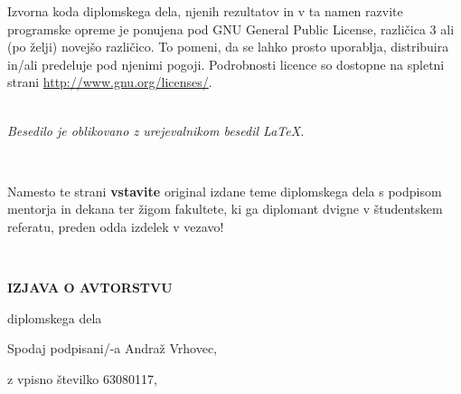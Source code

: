 \documentclass[12pt,a4paper,openany]{book}
\begin{document}
\vspace*{1.5cm}
{\small \noindent
Izvorna koda diplomskega dela, njenih rezultatov in v ta namen razvite programske opreme je ponujena pod GNU General Public License,
različica 3 ali (po želji) novejšo različico. To pomeni, da se lahko prosto uporablja, distribuira in/ali predeluje pod njenimi pogoji.
Podrobnosti licence so dostopne na spletni strani \url{http://www.gnu.org/licenses/}.
}

\begin{center} 
\ \\ \vfill
{\em
Besedilo je oblikovano z urejevalnikom besedil \LaTeX.
}
\end{center}

\newpage

\ \thispagestyle{empty}

\newpage


\thispagestyle{empty}

Namesto te strani {\bf vstavite} original izdane teme diplomskega dela s podpisom mentorja in dekana ter \v zigom fakultete, ki ga diplomant
dvigne v študent\-skem referatu,  preden odda izdelek v vezavo!

\newpage


\ \thispagestyle{empty}

\newpage



\thispagestyle{empty}

\vspace{1cm}
\begin{center} 
{\Large \textbf{IZJAVA O AVTORSTVU}}
\end{center}

\begin{center} 
{\Large diplomskega dela}
\end{center}

\vspace{1cm}
Spodaj podpisani/-a \hspace{0.5cm} Andraž Vrhovec,

\vspace{0.5cm}
z vpisno številko \hspace{0.5cm} 63080117,
\end{document}
